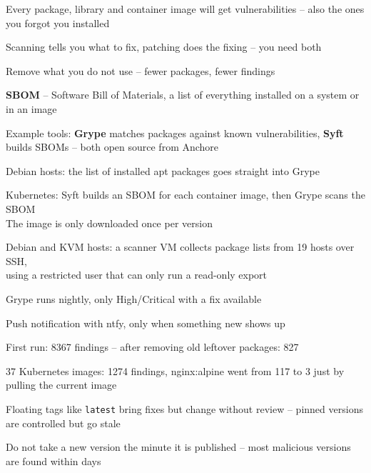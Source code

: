 \documentclass[Screen16to9,17pt]{foils}
\begin{document}
\begin{list2}
\item Every package, library and container image will get vulnerabilities -- also the ones you forgot you installed
\item Scanning tells you what to fix, patching does the fixing -- you need both
\item Remove what you do not use -- fewer packages, fewer findings
\item {\bf SBOM} -- Software Bill of Materials, a list of everything installed on a system or in an image
\item Example tools: {\bf Grype} matches packages against known vulnerabilities, {\bf Syft} builds SBOMs -- both open source from Anchore\\
\item Debian hosts: the list of installed apt packages goes straight into Grype
\item Kubernetes: Syft builds an SBOM for each container image, then Grype scans the SBOM\\
The image is only downloaded once per version
\end{list2}


\begin{list2}
\item Debian and KVM hosts: a scanner VM collects package lists from 19 hosts over SSH,\\
using a restricted user that can only run a read-only export
\item Grype runs nightly, only High/Critical with a fix available
\item Push notification with ntfy, only when something new shows up
\item First run: 8367 findings -- after removing old leftover packages: 827
\item 37 Kubernetes images: 1274 findings, nginx:alpine went from 117 to 3 just by pulling the current image
\item Floating tags like \verb+latest+ bring fixes but change without review -- pinned versions are controlled but go stale
\item Do not take a new version the minute it is published -- most malicious versions are found within days
\end{list2}

\end{document}
